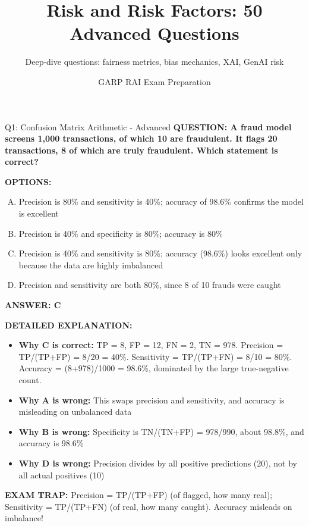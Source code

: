\documentclass[8pt]{beamer}
\title{Risk and Risk Factors: 50 Advanced Questions}
\subtitle{Deep-dive questions: fairness metrics, bias mechanics, XAI, GenAI risk}
\author{GARP RAI Exam Preparation}
\date{}
\begin{document}
\begin{frame}
	\titlepage
\end{frame}


\begin{frame}[shrink=6]{Q1: Confusion Matrix Arithmetic - Advanced}
\fontsize{6.5}{7.5}\selectfont
\textbf{QUESTION: A fraud model screens 1,000 transactions, of which 10 are fraudulent. It flags 20 transactions, 8 of which are truly fraudulent. Which statement is correct?}

\vspace{0.1cm}
\textbf{OPTIONS:}
\begin{enumerate}[A.]
\item Precision is 80\% and sensitivity is 40\%; accuracy of 98.6\% confirms the model is excellent
\item Precision is 40\% and specificity is 80\%; accuracy is 80\%
\item Precision is 40\% and sensitivity is 80\%; accuracy (98.6\%) looks excellent only because the data are highly imbalanced
\item Precision and sensitivity are both 80\%, since 8 of 10 frauds were caught
\end{enumerate}

\vspace{0.1cm}
\textcolor{myblue}{\textbf{ANSWER: C}}

\vspace{0.1cm}
\textbf{DETAILED EXPLANATION:}
\begin{itemize}
\item \textbf{Why C is correct:} TP = 8, FP = 12, FN = 2, TN = 978. Precision = TP/(TP+FP) = 8/20 = 40\%. Sensitivity = TP/(TP+FN) = 8/10 = 80\%. Accuracy = (8+978)/1000 = 98.6\%, dominated by the large true-negative count.
\item \textbf{Why A is wrong:} This swaps precision and sensitivity, and accuracy is misleading on unbalanced data
\item \textbf{Why B is wrong:} Specificity is TN/(TN+FP) = 978/990, about 98.8\%, and accuracy is 98.6\%
\item \textbf{Why D is wrong:} Precision divides by all positive predictions (20), not by all actual positives (10)
\end{itemize}

\textcolor{myred}{\textbf{EXAM TRAP:}} Precision = TP/(TP+FP) (of flagged, how many real); Sensitivity = TP/(TP+FN) (of real, how many caught). Accuracy misleads on imbalance!
\end{frame}
\end{document}
